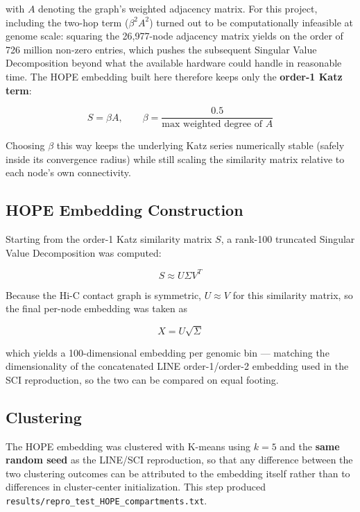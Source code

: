 \documentclass[12pt]{article}
\begin{document}
with $A$ denoting the graph's weighted adjacency matrix. For this project, including the two-hop
term ($\beta^2 A^2$) turned out to be computationally infeasible at genome scale: squaring the
26,977-node adjacency matrix yields on the order of 726 million non-zero entries, which pushes
the subsequent Singular Value Decomposition beyond what the available hardware could handle in
reasonable time. The HOPE embedding built here therefore keeps only the \textbf{order-1 Katz
term}:

\begin{equation}
    S = \beta A, \qquad \beta = \frac{0.5}{\text{max weighted degree of } A}
\end{equation}

Choosing $\beta$ this way keeps the underlying Katz series numerically stable (safely inside its
convergence radius) while still scaling the similarity matrix relative to each node's own
connectivity.

\subsection{HOPE Embedding Construction}
Starting from the order-1 Katz similarity matrix $S$, a rank-100 truncated Singular Value
Decomposition was computed:

\begin{equation}
    S \approx U \Sigma V^{T}
\end{equation}

Because the Hi-C contact graph is symmetric, $U \approx V$ for this similarity matrix, so the
final per-node embedding was taken as

\begin{equation}
    X = U \sqrt{\Sigma}
\end{equation}

which yields a 100-dimensional embedding per genomic bin — matching the dimensionality of the
concatenated LINE order-1/order-2 embedding used in the SCI reproduction, so the two can be
compared on equal footing.

\subsection{Clustering}
The HOPE embedding was clustered with K-means using $k=5$ and the \textbf{same random seed}
as the LINE/SCI reproduction, so that any difference between the two clustering outcomes can be
attributed to the embedding itself rather than to differences in cluster-center initialization.
This step produced \texttt{results/repro\_test\_HOPE\_compartments.txt}.
\end{document}
